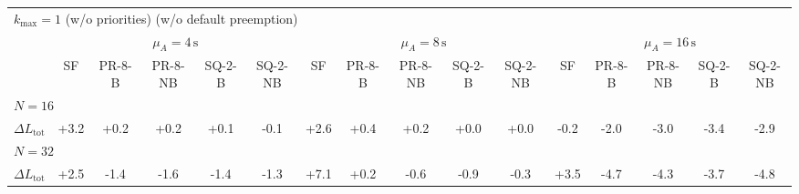 \begin{tabular}{l c c c c c c c c c c c c c c c}
\toprule
\multicolumn{16}{l}{$k_{\max}=1$ (w/o priorities) (w/o default preemption)} \\
\addlinespace[0.2em]
 & \multicolumn{5}{c}{$\mu_A=4\,\mathrm{s}$} & \multicolumn{5}{c}{$\mu_A=8\,\mathrm{s}$} & \multicolumn{5}{c}{$\mu_A=16\,\mathrm{s}$} \\
\cmidrule(lr){2-6}\cmidrule(lr){7-11}\cmidrule(lr){12-16}
 & SF & PR-8-B & PR-8-NB & SQ-2-B & SQ-2-NB & SF & PR-8-B & PR-8-NB & SQ-2-B & SQ-2-NB & SF & PR-8-B & PR-8-NB & SQ-2-B & SQ-2-NB \\
\midrule
\multicolumn{16}{l}{${N=16}$} \\
\midrule
$\Delta L_{\mathrm{tot}}$ & +3.2 & +0.2 & +0.2 & +0.1 & -0.1 & +2.6 & +0.4 & +0.2 & +0.0 & +0.0 & -0.2 & -2.0 & -3.0 & -3.4 & -2.9 \\
\midrule
\multicolumn{16}{l}{${N=32}$} \\
\midrule
$\Delta L_{\mathrm{tot}}$ & +2.5 & -1.4 & -1.6 & -1.4 & -1.3 & +7.1 & +0.2 & -0.6 & -0.9 & -0.3 & +3.5 & -4.7 & -4.3 & -3.7 & -4.8 \\
\bottomrule
\end{tabular}

